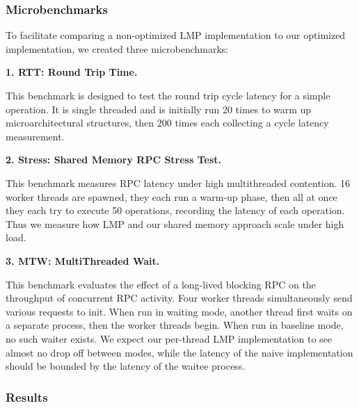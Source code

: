 \subsubsection{Microbenchmarks}
To facilitate comparing a non-optimized LMP implementation to our optimized implementation, we created 
three microbenchmarks:
\begin{description}
    \item \textbf{1. RTT: Round Trip Time.}
    
    This benchmark is designed to test the round trip cycle latency for a simple \newline {} operation. It is single threaded and is initially run 20 times to warm up microarchitectural structures, then 200 times each collecting a cycle latency measurement.

    \item \textbf{2. Stress: Shared Memory RPC Stress Test.}
    
    This benchmark measures RPC latency under high multithreaded contention. 16 worker threads are spawned, they each run a warm-up phase, then all at once they each try to execute 50  operations, recording the latency of each operation. Thus we measure how LMP and our shared memory approach scale under high load.

    \item \textbf{3. MTW: MultiThreaded Wait.}
    
    This benchmark evaluates the effect of a long-lived blocking RPC on the throughput of concurrent RPC activity. Four worker threads simultaneously send various  requests to init. When run in waiting mode, another thread first waits on a separate process, then the worker threads begin. When run in baseline mode, no such waiter exists. We expect our per-thread LMP implementation to see almost no drop off between modes, while the latency of the naive implementation should be bounded by the latency of the waitee process.
\end{description}
\subsubsection{Results}

